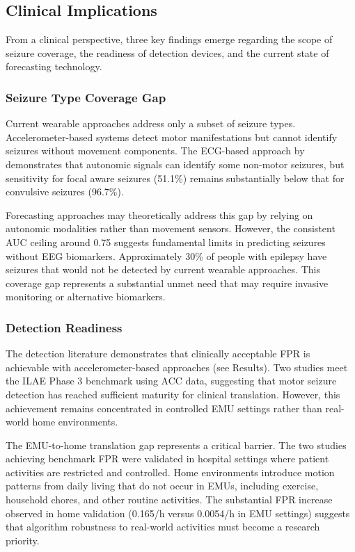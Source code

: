 \subsection{Clinical Implications}

From a clinical perspective, three key findings emerge regarding the scope of seizure coverage, the readiness of detection devices, and the current state of forecasting technology.

\subsubsection{Seizure Type Coverage Gap}

Current wearable approaches address only a subset of seizure types. Accelerometer-based systems detect motor manifestations but cannot identify seizures without movement components. The ECG-based approach by \textcite{reintjesECGBasedDetectionEpileptic2025} demonstrates that autonomic signals can identify some non-motor seizures, but sensitivity for focal aware seizures (51.1\%) remains substantially below that for convulsive seizures (96.7\%).

Forecasting approaches may theoretically address this gap by relying on autonomic modalities rather than movement sensors. However, the consistent AUC ceiling around 0.75 suggests fundamental limits in predicting seizures without EEG biomarkers. Approximately 30\% of people with epilepsy have seizures that would not be detected by current wearable approaches. This coverage gap represents a substantial unmet need that may require invasive monitoring or alternative biomarkers.

\subsubsection{Detection Readiness}

The detection literature demonstrates that clinically acceptable FPR is achievable with accelerometer-based approaches (see Results). Two studies meet the ILAE Phase 3 benchmark using ACC data, suggesting that motor seizure detection has reached sufficient maturity for clinical translation. However, this achievement remains concentrated in controlled EMU settings rather than real-world home environments.

The EMU-to-home translation gap represents a critical barrier. The two studies achieving benchmark FPR were validated in hospital settings where patient activities are restricted and controlled. Home environments introduce motion patterns from daily living that do not occur in EMUs, including exercise, household chores, and other routine activities. The substantial FPR increase observed in home validation (0.165/h versus 0.0054/h in EMU settings) suggests that algorithm robustness to real-world activities must become a research priority.


